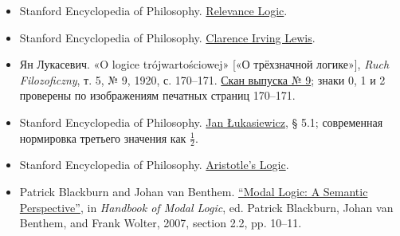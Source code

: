 \documentclass[12pt,a4paper]{article}
\begin{document}
\begin{itemize}
\item Stanford Encyclopedia of Philosophy. \href{https://plato.stanford.edu/entries/logic-relevance/}{Relevance Logic}.
\item Stanford Encyclopedia of Philosophy. \href{https://plato.stanford.edu/entries/lewis-ci/}{Clarence Irving Lewis}.
\item Ян Лукасевич. «O logice trójwartościowej» [«О трёхзначной логике»], \emph{Ruch Filozoficzny}, т. 5, № 9, 1920, с. 170–171. \href{https://kpbc.umk.pl/Content/247342/PDF/EOD_OPEN_006_12_nr_09.pdf}{Скан выпуска № 9}; знаки 0, 1 и 2 проверены по изображениям печатных страниц 170–171.
\item Stanford Encyclopedia of Philosophy. \href{https://plato.stanford.edu/entries/lukasiewicz/}{Jan Łukasiewicz}, § 5.1; современная нормировка третьего значения как \(\tfrac12\).
\item Stanford Encyclopedia of Philosophy. \href{https://plato.stanford.edu/entries/aristotle-logic/}{Aristotle’s Logic}.
\item Patrick Blackburn and Johan van Benthem. \href{https://doi.org/10.1016/S1570-2464(07)80004-8}{“Modal Logic: A Semantic Perspective”}, in \emph{Handbook of Modal Logic}, ed. Patrick Blackburn, Johan van Benthem, and Frank Wolter, 2007, section 2.2, pp. 10–11.
\end{itemize}
\end{document}
